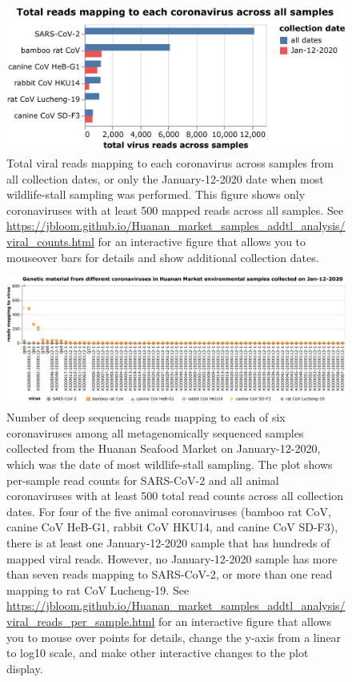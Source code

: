 \documentclass[9pt,twocolumn,twoside]{gsajnl_modified}
\begin{document}
\begin{figure}
\includegraphics[width=\linewidth]{figures/viral_counts.png}
\caption{
Total viral reads mapping to each coronavirus across samples from all collection dates, or only the January-12-2020 date when most wildlife-stall sampling was performed.
This figure shows only coronaviruses with at least 500 mapped reads across all samples.
See \url{https://jbloom.github.io/Huanan_market_samples_addtl_analysis/viral_counts.html} for an interactive figure that allows you to mouseover bars for details and show additional collection dates.
\label{fig:viral_counts}
}
\end{figure}

\begin{figure}[b]
\includegraphics[width=\linewidth]{figures/viral_reads_per_sample.png}
\caption{
Number of deep sequencing reads mapping to each of six coronaviruses among all metagenomically sequenced samples collected from the Huanan Seafood Market on January-12-2020, which was the date of most wildlife-stall sampling.
The plot shows per-sample read counts for SARS-CoV-2 and all animal coronaviruses with at least 500 total read counts across all collection dates.
For four of the five animal coronaviruses (bamboo rat CoV, canine CoV HeB-G1, rabbit CoV HKU14, and canine CoV SD-F3), there is at least one January-12-2020 sample that has hundreds of mapped viral reads.
However, no January-12-2020 sample has more than seven reads mapping to SARS-CoV-2, or more than one read mapping to rat CoV Lucheng-19.
See \url{https://jbloom.github.io/Huanan_market_samples_addtl_analysis/viral_reads_per_sample.html} for an interactive figure that allows you to mouse over points for details, change the y-axis from a linear to log10 scale, and make other interactive changes to the plot display.
\label{fig:viral_reads}
}
\end{figure}
\end{document}
